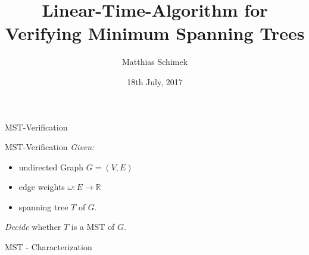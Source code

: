 \documentclass[18pt]{beamer}
\title[Linear-Time Algorithm for Verifiying MST]{Linear-Time-Algorithm for Verifying Minimum Spanning Trees}
\author{Matthias Schimek}
\institute{Institute of Theoretical Informatics}
\date{18th July, 2017}
\begin{document}

\begin{frame}
\titlepage
\end{frame}

\begin{frame}{MST-Verification}
	\begin{block}{MST-Verification}
	\emph{Given:} 
	\begin{itemize}
		\item undirected Graph $G=(V,E)$
		\item edge weights $\omega: E \rightarrow \mathbb{R}$
		\item spanning tree $T$ of $G$.
	\end{itemize}
	\emph{Decide} whether $T$ is a MST of $G$.
	\end{block}
	\bigskip
	\pause
	\begin{block}{MST - Characterization}
	\end{block}
\end{frame}
\end{document}
